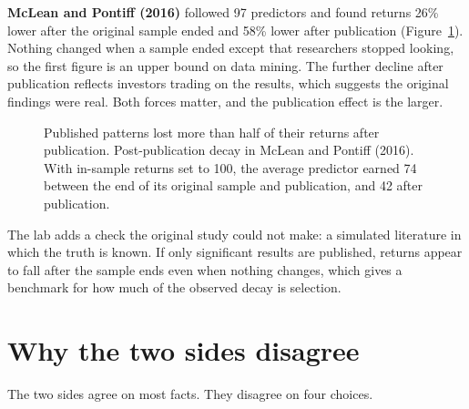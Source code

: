 \textbf{McLean and Pontiff (2016)} followed 97 predictors and found returns 26\% lower after the original sample ended and 58\% lower after publication (Figure~\ref{fig:19-decay}). Nothing changed when a sample ended except that researchers stopped looking, so the first figure is an upper bound on data mining. The further decline after publication reflects investors trading on the results, which suggests the original findings were real. Both forces matter, and the publication effect is the larger.

\begin{figure}[htbp]
\centering
{}
\caption{Published patterns lost more than half of their returns after publication. Post-publication decay in McLean and Pontiff (2016). With in-sample returns set to 100, the average predictor earned 74 between the end of its original sample and publication, and 42 after publication.}
\label{fig:19-decay}
\end{figure}

The lab adds a check the original study could not make: a simulated literature in which the truth is known. If only significant results are published, returns appear to fall after the sample ends even when nothing changes, which gives a benchmark for how much of the observed decay is selection.

\section{Why the two sides disagree}
\label{sec:19-why}

The two sides agree on most facts. They disagree on four choices.

